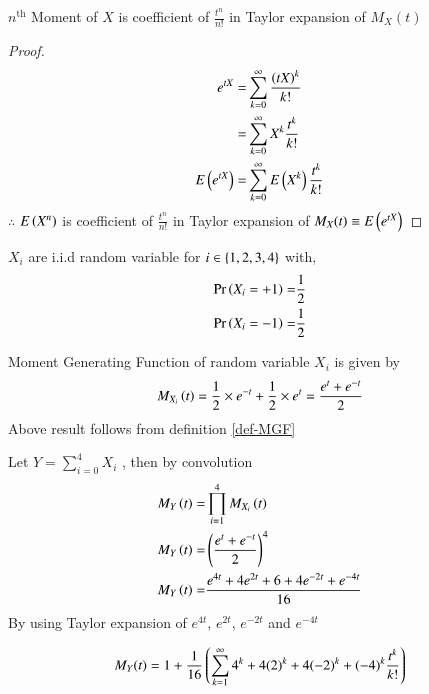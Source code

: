 \documentclass[journal,12pt,twocolumn]{IEEEtran}
\begin{document}
\begin{theorem}
$n^{\text{th}}$ Moment of $X$  is coefficient of $\frac{t^n}{n!}$ in Taylor expansion of $M_X(t)$
\label{nth-Moment-Theorem}
\end{theorem}

\begin{proof}
\begin{align}
    e^{t X}=&\sum_{k=0}^{\infty} \frac{\left(tX\right)^k}{k!}
    \\=&\sum_{k=0}^{\infty}X^k \frac{{t}^k}{k!}
    \\E\left(e^{t X}\right)=&\sum_{k=0}^{\infty}E\left(X^k\right) \frac{{t}^k}{k!}
\end{align}
$\therefore$ $E\left(X^n\right)$ is coefficient of $\frac{{t}^n}{n!}$ in Taylor expansion of $M_X(t) \equiv E\left(e^{t X}\right)$  
\end{proof}

$X_i$ are i.i.d random variable for $i \in \left\{1,2,3,4\right\} $ 
with,
\begin{align}
    \Pr\left(X_i=+1\right)=&\frac{1}{2}
    \\\Pr\left(X_i=-1\right)=&\frac{1}{2}
\end{align}

\begin{lemma}
Moment Generating Function of random variable $X_i$ is given by 
\begin{align}
    M_{X_i}\left(t\right)=\frac{1}{2}\times e^{-t} + \frac{1}{2} \times e^{t}=\frac{e^{t}+e^{-t}}{2}
\end{align}
Above result follows from definition \ref{def-MGF} 
\end{lemma}

Let $Y=\sum_{i=0}^{4}X_i$ , then by convolution
\begin{align}
    M_{Y}\left(t\right)=& \prod_{i=1}^{4} M_{X_i}\left(t\right) 
    \\M_{Y}\left(t\right) =& \left(\frac{e^{t}+e^{-t}}{2}\right)^4
    \\M_{Y}\left(t\right) =& \frac{e^{4t}+4e^{2t}+6+4e^{-2t}+e^{-4t}}{16}
\end{align}
By using Taylor expansion of $e^{4t}$, $e^{2t}$, $e^{-2t}$ and $e^{-4t}$

\begin{corollary}
\begin{align}
    M_Y(t)=1+ \frac{1}{16}\left( \sum_{k=1}^{\infty} 4^k+4(2)^k+4(-2)^k+(-4)^k\frac{t^k}{k!} \right)
    \label{eqn:M_Y(t)}
\end{align}
\end{corollary}
 
\end{document}
